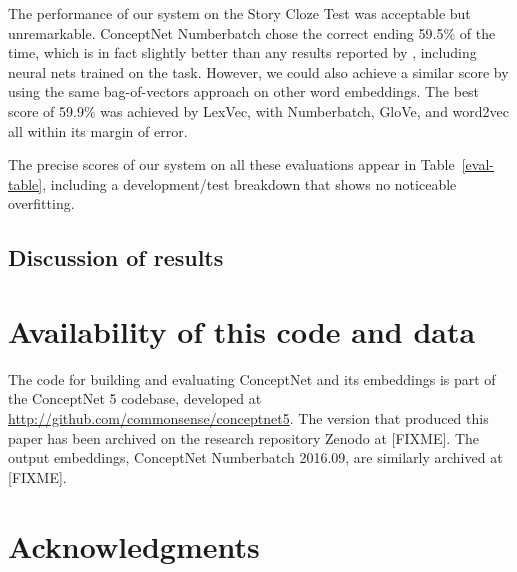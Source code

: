 \documentclass[letterpaper]{article}
\begin{document}
The performance of our system on the Story Cloze Test was acceptable but
unremarkable.  ConceptNet Numberbatch chose the correct ending 59.5\% of the
time, which is in fact slightly better than any results reported by
\citeauthor{mostafazadeh2016cloze} \citeyear{mostafazadeh2016cloze}, including
neural nets trained on the task. However, we could also achieve a similar score
by using the same bag-of-vectors approach on other word embeddings. The best
score of 59.9\% was achieved by LexVec, with Numberbatch, GloVe, and word2vec
all within its margin of error.

The precise scores of our system on all these evaluations appear in
Table~\ref{eval-table}, including a development/test breakdown that shows no
noticeable overfitting.


\subsection{Discussion of results}

\section{Availability of this code and data}


The code for building and evaluating ConceptNet and its embeddings is part of
the ConceptNet 5 codebase, developed at \url{http://github.com/commonsense/conceptnet5}.
The version that produced this paper has been archived on the research repository
Zenodo at [FIXME]. The output embeddings, ConceptNet Numberbatch 2016.09, are similarly
archived at [FIXME].

\section{Acknowledgments}



\end{document}
